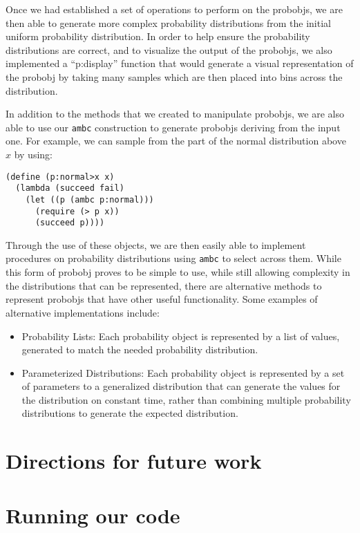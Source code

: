 \documentclass{article}
\begin{document}
Once we had established a set of operations to perform on the
{probobj}s, we are then able to generate more complex probability
distributions from the initial uniform probability distribution. In
order to help ensure the probability distributions are correct, and to
visualize the output of the {probobj}s, we also implemented a
``p:display'' function that would generate a visual representation of
the {probobj} by taking many samples which are then placed into bins
across the distribution.

In addition to the methods that we created to manipulate {probobj}s,
we are also able to use our \texttt{ambc} construction to generate
{probobj}s deriving from the input one. For example, we can sample
from the part of the normal distribution above $x$ by using:

\begin{lstlisting}
(define (p:normal>x x)
  (lambda (succeed fail)
    (let ((p (ambc p:normal)))
      (require (> p x))
      (succeed p))))
\end{lstlisting}

Through the use of these objects, we are then easily able to implement
procedures on probability distributions using \texttt{ambc} to select across
them. While this form of {probobj} proves to be simple to use, while still
allowing complexity in the distributions that can be represented, there are
alternative methods to represent {probobj}s that have other useful
functionality. Some examples of alternative implementations include:

\begin{itemize}
  \item Probability Lists: Each probability object is represented by a list of
    values, generated to match the needed probability distribution.
  \item Parameterized Distributions: Each probability object is represented by a
    set of parameters to a generalized distribution that can generate the values
    for the distribution on constant time, rather than combining multiple
    probability distributions to generate the expected distribution.
\end{itemize} 

\section{Directions for future work}

\appendix

\section{Running our code}
\end{document}
